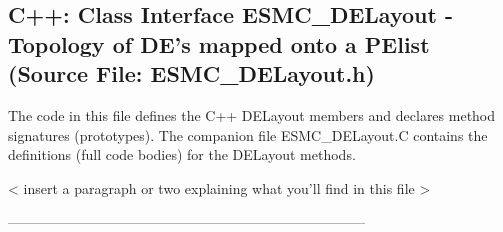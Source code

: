  
\parskip        0pt
\parindent      0pt
\baselineskip  11pt
 
\def\bv{\begin{verbatim}}
\def\ev{\end{verbatim}}
\def\be{\begin{equation}}
\def\ee{\end{equation}}
\def\bea{\begin{eqnarray}}
\def\eea{\end{eqnarray}}
\def\bi{\begin{itemize}}
\def\ei{\end{itemize}}
\def\bn{\begin{enumerate}}
\def\en{\end{enumerate}}
\def\bd{\begin{description}}
\def\ed{\end{description}}
\def\({\left (}
\def\){\right )}
\def\[{\left [}
\def\]{\right ]}
\def\<{\left  \langle}
\def\>{\right \rangle}
\def\cI{{\cal I}}
\def\diag{\mathop{\rm diag}}
\def\tr{\mathop{\rm tr}}


 
\subsection{C++:  Class Interface ESMC\_DELayout - Topology of DE's mapped onto a PElist (Source File: ESMC\_DELayout.h)}


  
  
   The code in this file defines the C++ DELayout members and declares method 
   signatures (prototypes).  The companion file ESMC\_DELayout.C contains
   the definitions (full code bodies) for the DELayout methods.
  
   < insert a paragraph or two explaining what you'll find in this file >
  
  -----------------------------------------------------------------------------
   

